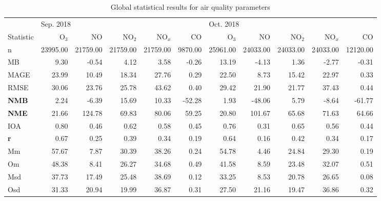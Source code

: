 \begin{table}
\begin{threeparttable}[b]
\footnotesize
\centering
\caption{Global statistical results for air quality parameters}
\label{tab: gl_st}
\begin{tabular}{lrrrrrrrrrr}
\toprule
{} & \multicolumn{5}{l}{Sep. 2018} & \multicolumn{5}{l}{Oct. 2018} \\
Statistic\tnote{(a)} &       O$_3$ &        NO &    NO$_2$ &    NO$_x$ &       CO &     O$_3$ &        NO &    NO$_2$ &    NO$_x$ &        CO \\
\midrule
n    &  23995.00 &  21759.00 &  21759.00 &  21759.00 &  9870.00 &  25961.00 &  24033.00 &  24033.00 &  24033.00 &  12120.00 \\
MB   &      9.30 &     -0.54 &      4.12 &      3.58 &    -0.26 &     13.19 &     -4.13 &      1.36 &     -2.77 &     -0.31 \\
MAGE &     23.99 &     10.49 &     18.34 &     27.76 &     0.29 &     22.50 &      8.73 &     15.42 &     22.97 &      0.33 \\
RMSE &     30.06 &     23.76 &     25.78 &     43.62 &     0.40 &     29.42 &     21.90 &     21.77 &     37.43 &      0.44 \\
\bf{NMB}\tnote{(b)}  &      2.24 &     -6.39 &     15.69 &     10.33 &   -52.28 &      1.93 &    -48.06 &      5.79 &     -8.64 &    -61.77 \\
\bf{NME}\tnote{(b)}  &     21.66 &    124.78 &     69.83 &     80.06 &    59.25 &     20.80 &    101.67 &     65.68 &     71.63 &     64.66 \\
IOA  &      0.80 &      0.46 &      0.62 &      0.58 &     0.45 &      0.76 &      0.31 &      0.65 &      0.56 &      0.44 \\
\bf{r }    &      0.67 &      0.25 &      0.39 &      0.34 &     0.19 &      0.64 &      0.16 &      0.42 &      0.34 &      0.17 \\
Mm   &     57.67 &      7.87 &     30.39 &     38.26 &     0.24 &     54.78 &      4.46 &     24.84 &     29.30 &      0.19 \\
Om   &     48.38 &      8.41 &     26.27 &     34.68 &     0.49 &     41.58 &      8.59 &     23.48 &     32.07 &      0.51 \\
Msd  &     37.73 &     17.49 &     25.48 &     38.69 &     0.12 &     33.25 &      8.53 &     20.78 &     26.65 &      0.08 \\
Osd  &     31.33 &     20.94 &     19.99 &     36.87 &     0.31 &     27.50 &     21.16 &     19.47 &     36.86 &      0.32 \\


\end{tabular}
\end{threeparttable}
\end{table}
